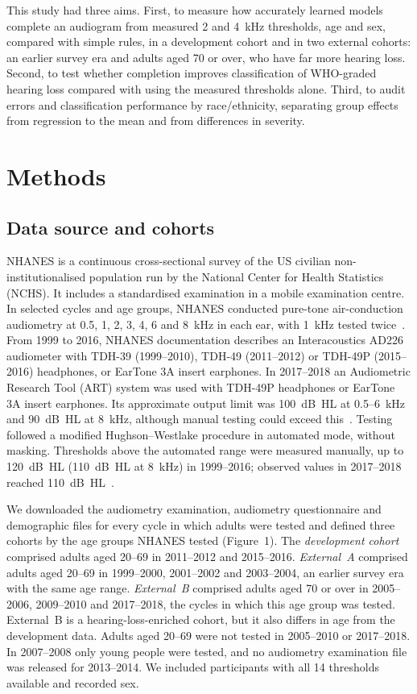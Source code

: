 \documentclass[11pt]{article}
\begin{document}
This study had three aims. First, to measure how accurately learned models complete an audiogram from measured 2 and 4~kHz thresholds, age and sex, compared with simple rules, in a development cohort and in two external cohorts: an earlier survey era and adults aged 70 or over, who have far more hearing loss. Second, to test whether completion improves classification of WHO-graded hearing loss compared with using the measured thresholds alone. Third, to audit errors and classification performance by race/ethnicity, separating group effects from regression to the mean and from differences in severity.

\section*{Methods}

\subsection*{Data source and cohorts}
NHANES is a continuous cross-sectional survey of the US civilian non-institutionalised population run by the National Center for Health Statistics (NCHS). It includes a standardised examination in a mobile examination centre. In selected cycles and age groups, NHANES conducted pure-tone air-conduction audiometry at 0.5, 1, 2, 3, 4, 6 and 8~kHz in each ear, with 1~kHz tested twice~\cite{nhanes_aux_g,nhanes_aux_i}. From 1999 to 2016, NHANES documentation describes an Interacoustics AD226 audiometer with TDH-39 (1999--2010), TDH-49 (2011--2012) or TDH-49P (2015--2016) headphones, or EarTone 3A insert earphones. In 2017--2018 an Audiometric Research Tool (ART) system was used with TDH-49P headphones or EarTone 3A insert earphones. Its approximate output limit was 100~dB~HL at 0.5--6~kHz and 90~dB~HL at 8~kHz, although manual testing could exceed this~\cite{nhanes_aux_j}. Testing followed a modified Hughson--Westlake procedure in automated mode, without masking. Thresholds above the automated range were measured manually, up to 120~dB~HL (110~dB~HL at 8~kHz) in 1999--2016; observed values in 2017--2018 reached 110~dB~HL~\cite{nhanes_aux_g,nhanes_aux_i,nhanes_aux_j}.

We downloaded the audiometry examination, audiometry questionnaire and demographic files for every cycle in which adults were tested and defined three cohorts by the age groups NHANES tested (Figure~1). The \emph{development cohort} comprised adults aged 20--69 in 2011--2012 and 2015--2016. \emph{External~A} comprised adults aged 20--69 in 1999--2000, 2001--2002 and 2003--2004, an earlier survey era with the same age range. \emph{External~B} comprised adults aged 70 or over in 2005--2006, 2009--2010 and 2017--2018, the cycles in which this age group was tested. External~B is a hearing-loss-enriched cohort, but it also differs in age from the development data. Adults aged 20--69 were not tested in 2005--2010 or 2017--2018. In 2007--2008 only young people were tested, and no audiometry examination file was released for 2013--2014. We included participants with all 14 thresholds available and recorded sex.
\end{document}
